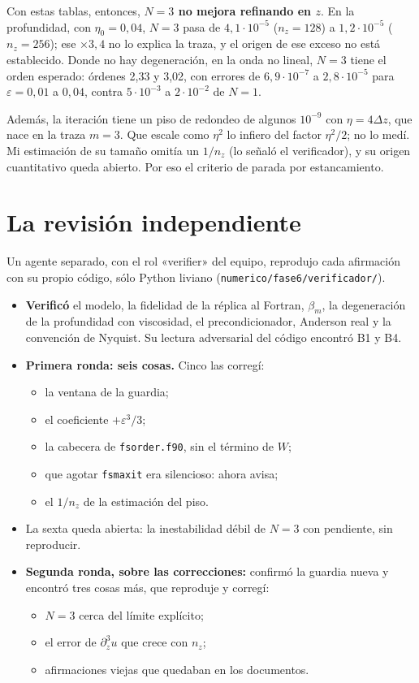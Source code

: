 \documentclass[11pt,a4paper]{article}
\newcommand{\archivo}[1]{\nolinkurl{#1}}
\newcommand{\NLtresErr}{órdenes 2,33 y 3,02, con errores de $6{,}9\cdot10^{-7}$ a $2{,}8\cdot10^{-5}$ para $\varepsilon=0{,}01$ a $0{,}04$, contra $5\cdot10^{-3}$ a $2\cdot10^{-2}$ de $N=1$}
\begin{document}
Con estas tablas, entonces, \textbf{$N=3$ no mejora refinando en $z$}. En la profundidad, con
$\eta_0=0{,}04$, $N=3$ pasa de $4{,}1\cdot10^{-5}$ ($n_z=128$) a $1{,}2\cdot10^{-5}$ ($n_z=256$);
ese $\times3{,}4$ no lo explica la traza, y el origen de ese exceso no está establecido. Donde no
hay degeneración, en la onda no lineal, $N=3$ tiene el orden esperado: \NLtresErr.

Además, la iteración tiene un piso de redondeo de algunos $10^{-9}$ con $\eta=4\Delta z$, que
nace en la traza $m=3$. Que escale como $\eta^2$ lo infiero del factor $\eta^2/2$; no lo medí.
Mi estimación de su tamaño omitía un $1/n_z$ (lo señaló el verificador), y su origen cuantitativo
queda abierto. Por eso el criterio de parada por estancamiento.

\section{La revisión independiente}

Un agente separado, con el rol «verifier» del equipo, reprodujo cada afirmación con su propio
código, sólo Python liviano (\archivo{numerico/fase6/verificador/}).
\begin{itemize}
\item \textbf{Verificó} el modelo, la fidelidad de la réplica al Fortran, $\beta_m$, la
  degeneración de la profundidad con viscosidad, el precondicionador, Anderson real y la
  convención de Nyquist. Su lectura adversarial del código encontró B1 y B4.
\item \textbf{Primera ronda: seis cosas.} Cinco las corregí:
  \begin{itemize}
  \item la ventana de la guardia;
  \item el coeficiente $+\varepsilon^3/3$;
  \item la cabecera de \texttt{fsorder.f90}, sin el término de $W$;
  \item que agotar \texttt{fsmaxit} era silencioso: ahora avisa;
  \item el $1/n_z$ de la estimación del piso.
  \end{itemize}
\item La sexta queda abierta: la inestabilidad débil de $N=3$ con pendiente, sin reproducir.
\item \textbf{Segunda ronda, sobre las correcciones:} confirmó la guardia nueva y encontró tres
  cosas más, que reproduje y corregí:
  \begin{itemize}
  \item $N=3$ cerca del límite explícito;
  \item el error de $\partial_z^3u$ que crece con $n_z$;
  \item afirmaciones viejas que quedaban en los documentos.
  \end{itemize}
\end{itemize}
\end{document}
